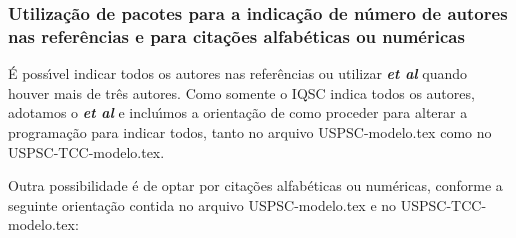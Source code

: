 \subsubsection{Utiliza\c{c}\~ao de pacotes para a indica\c{c}\~ao de n\'umero de autores nas refer\^encias e para cita\c{c}\~oes alfab\'eticas ou num\'ericas}
\'E poss\'{\i}vel indicar todos os autores nas refer\^encias ou utilizar \textbf{\textit{et al}} quando houver mais de tr\^es autores. Como somente o IQSC indica todos os autores, adotamos o \textbf{\textit{et al}} e inclu\'{\i}mos a orienta\c{c}\~ao de como proceder para alterar a programa\c{c}\~ao para indicar todos, tanto no arquivo USPSC-modelo.tex como no USPSC-TCC-modelo.tex.

Outra possibilidade \'e de optar por cita\c{c}\~oes alfab\'eticas ou num\'ericas, conforme a seguinte orienta\c{c}\~ao contida no arquivo USPSC-modelo.tex e no USPSC-TCC-modelo.tex:	
		  
